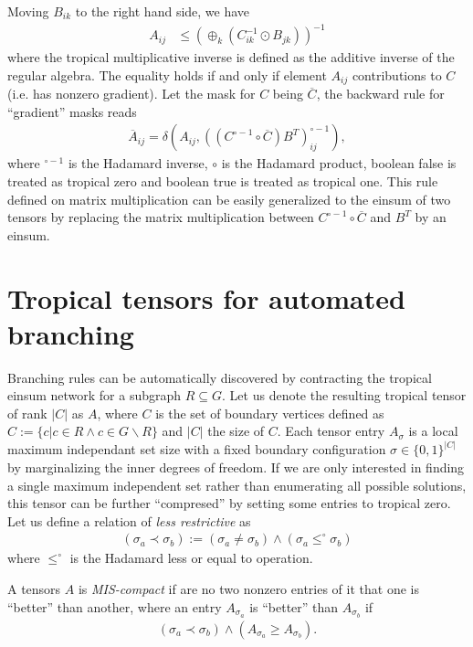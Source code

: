 \documentclass[review,onefignum,onetabnum]{siamart190516}
\newcommand{\<}{\langle}
\renewcommand{\>}{\rangle}
\begin{document}
Moving $B_{ik}$ to the right hand side, we have
\begin{align}
    A_{ij} &\leq (\oplus_{k} (C_{ik}^{-1} \odot B_{jk}))^{-1}
\end{align}
where the tropical multiplicative inverse is defined as the additive inverse of the regular algebra. The equality holds if and only if element $A_{ij}$ contributions to $C$ (i.e. has nonzero gradient).
Let the mask for $C$ being $\overline C$, the backward rule for ``gradient'' masks reads
\begin{align}
\overline{A}_{ij} = \delta(A_{ij}, ((C^{\circ-1} \circ \overline C )B^T)_{ij}^{\circ -1}),
\end{align}
where ${}^{\circ -1}$ is the Hadamard inverse, $\circ$ is the Hadamard product, boolean false is treated as tropical zero and boolean true is treated as tropical one.
This rule defined on matrix multiplication can be easily generalized to the einsum of two tensors by replacing the matrix multiplication between $C^{\circ-1} \circ \overline C$ and $B^T$ by an einsum.

\section{Tropical tensors for automated branching}
Branching rules can be automatically discovered by contracting the tropical einsum network for a subgraph $R \subseteq G$.
Let us denote the resulting tropical tensor of rank $|C|$ as $A$, where $C$ is the set of boundary vertices defined as $C := \{c | c\in R \land c \in G\backslash R\}$ and $|C|$ the size of $C$.
Each tensor entry $A_{\sigma}$ is a local maximum independant set size with a fixed boundary configuration $\sigma \in \{0,1\}^{|C|}$ by marginalizing the inner degrees of freedom.
If we are only interested in finding a single maximum independent set rather than enumerating all possible solutions,
this tensor can be further ``compresed'' by setting some entries to tropical zero.
Let us define a relation of \textit{less restrictive} as
\begin{align}
(\sigma_a \prec \sigma_b) := (\sigma_a \neq \sigma_b) \land (\sigma_a \leq^\circ \sigma_b)
\end{align}
where $\leq^\circ$ is the Hadamard less or equal to operation.

\begin{definition}
A tensors $A$ is \textit{MIS-compact} if are no two nonzero entries of it that one is ``better'' than another,
where an entry $A_{\sigma_a}$ is ``better'' than $A_{\sigma_b}$ if
\begin{align}
(\sigma_a \prec \sigma_b) \land (A_{\sigma_a} \geq A_{\sigma_b})\label{eq:compactifying}.
\end{align}
\end{definition}
\end{document}
